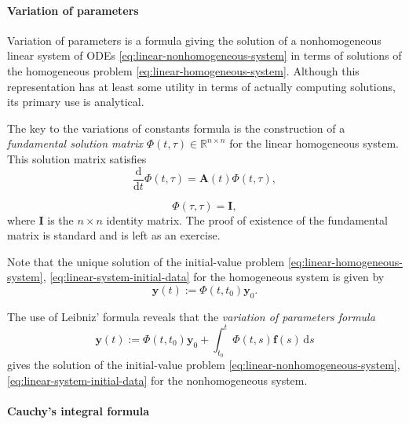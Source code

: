 \paragraph*{Variation of parameters}

Variation of parameters is a formula giving the solution of a nonhomogeneous linear system of ODEs \eqref{eq:linear-nonhomogeneous-system} in terms of solutions of the homogeneous problem \eqref{eq:linear-homogeneous-system}. Although this representation has at least some utility in terms of actually computing solutions, its primary use is analytical.

The key to the variations of constants formula is the construction of a \emph{fundamental solution matrix} $\Phi(t,\tau)\in\mathbb{R}^{n\times n}$ for the linear homogeneous system. This solution matrix satisfies
\begin{equation}\label{eq:fundamental-matrix-dynamics}
\dfrac{\mathrm{d}}{\mathrm{d}t}\Phi(t,\tau)=\bm{A}(t)\Phi(t,\tau),
\end{equation}

\begin{equation}\label{eq:fundamental-matrix-normalization}
\Phi(\tau,\tau)=\bm{I},
\end{equation}
where $\bm{I}$ is the $n\times n$ identity matrix. The proof of existence of the fundamental matrix is standard and is left as an exercise.

Note that the unique solution of the initial-value problem \eqref{eq:linear-homogeneous-system}, \eqref{eq:linear-system-initial-data} for the homogeneous system is given by
\begin{equation}\label{eq:fundamental-matrix-homogeneous-solution}
\bm{y}(t):=\Phi(t,t_0)\bm{y}_0.
\end{equation}


The use of Leibniz' formula reveals that the \emph{variation of parameters formula}
\begin{equation}\label{eq:variation-of-parameters}
\bm{y}(t):=\Phi(t,t_0)\bm{y}_0+\int_{t_0}^t\Phi(t,s)\bm{f}(s)\,\mathrm{d}s
\end{equation}
gives the solution of the initial-value problem \eqref{eq:linear-nonhomogeneous-system}, \eqref{eq:linear-system-initial-data} for the nonhomogeneous system.

\paragraph*{Cauchy's integral formula}

